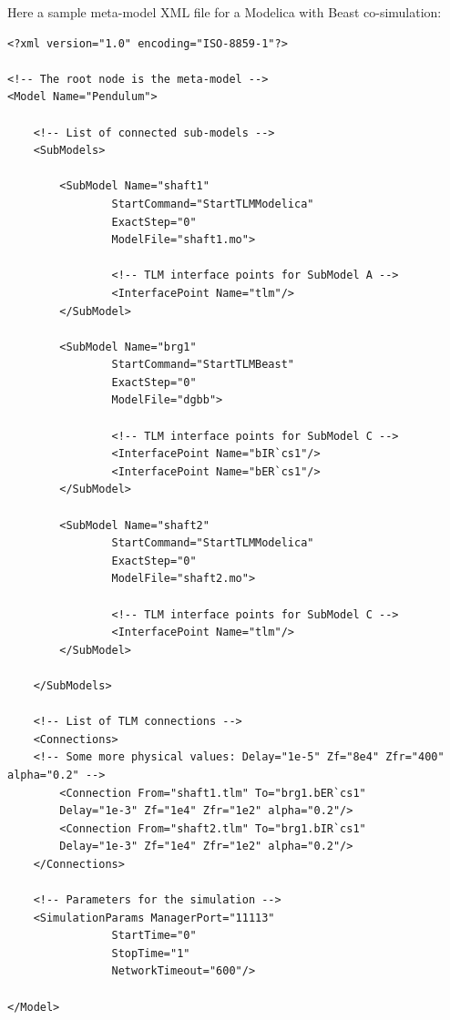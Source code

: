 Here a sample meta-model XML file for a Modelica with Beast co-simulation:
{\scriptsize
\begin{verbatim}
<?xml version="1.0" encoding="ISO-8859-1"?>

<!-- The root node is the meta-model -->
<Model Name="Pendulum">

    <!-- List of connected sub-models -->
    <SubModels>	

        <SubModel Name="shaft1"
                StartCommand="StartTLMModelica"
                ExactStep="0"
                ModelFile="shaft1.mo">

                <!-- TLM interface points for SubModel A -->
                <InterfacePoint Name="tlm"/>
        </SubModel>

        <SubModel Name="brg1"
                StartCommand="StartTLMBeast"
                ExactStep="0"
                ModelFile="dgbb">

                <!-- TLM interface points for SubModel C -->
                <InterfacePoint Name="bIR`cs1"/>
                <InterfacePoint Name="bER`cs1"/>
        </SubModel>

        <SubModel Name="shaft2"
                StartCommand="StartTLMModelica"
                ExactStep="0"
                ModelFile="shaft2.mo">

                <!-- TLM interface points for SubModel C -->
                <InterfacePoint Name="tlm"/>
        </SubModel>

    </SubModels>

    <!-- List of TLM connections -->
    <Connections>
	<!-- Some more physical values: Delay="1e-5" Zf="8e4" Zfr="400" alpha="0.2" -->
        <Connection From="shaft1.tlm" To="brg1.bER`cs1"
		Delay="1e-3" Zf="1e4" Zfr="1e2" alpha="0.2"/>
        <Connection From="shaft2.tlm" To="brg1.bIR`cs1"
		Delay="1e-3" Zf="1e4" Zfr="1e2" alpha="0.2"/>
    </Connections>

    <!-- Parameters for the simulation -->
    <SimulationParams ManagerPort="11113"
                StartTime="0"
                StopTime="1"
                NetworkTimeout="600"/>

</Model>
\end{verbatim}
}
